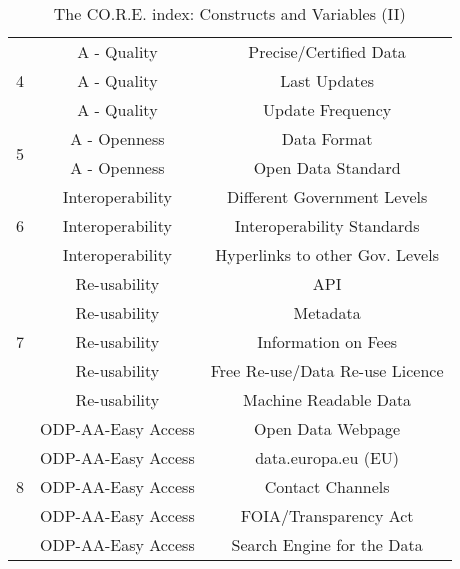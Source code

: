\documentclass[a4paper, twoside]{report}
\begin{document}
\begin{table}[htbp]
  \centering
  \caption{The CO.R.E. index: Constructs and Variables (II)}
   \tabcolsep=0.60cm
	\renewcommand{\arraystretch}{1.2}
	\begin{adjustbox}{max width=\linewidth}
    \begin{tabular}{ccc}
    \toprule
    \multirow{3}[2]{*}{4} & A - Quality & Precise/Certified Data \\
          & \cellcolor[rgb]{ .851,  .851,  .851}A - Quality & \cellcolor[rgb]{ .851,  .851,  .851}Last Updates \\
          & \cellcolor[rgb]{ .851,  .851,  .851}A - Quality & \cellcolor[rgb]{ .851,  .851,  .851}Update Frequency \\
    \midrule
    \multirow{2}[2]{*}{5} & A - Openness & Data Format \\
          & \cellcolor[rgb]{ .851,  .851,  .851}A - Openness & \cellcolor[rgb]{ .851,  .851,  .851}Open Data Standard \\
    \midrule
    \multirow{3}[2]{*}{6} & Interoperability & Different Government Levels \\
          & \cellcolor[rgb]{ .851,  .851,  .851}Interoperability & \cellcolor[rgb]{ .851,  .851,  .851}Interoperability Standards \\
          & \cellcolor[rgb]{ .851,  .851,  .851}Interoperability & \cellcolor[rgb]{ .851,  .851,  .851}Hyperlinks to other Gov. Levels \\
    \midrule
    \multirow{5}[2]{*}{7} & Re-usability & API \\
          & Re-usability & Metadata \\
          & Re-usability & Information on Fees \\
          & \cellcolor[rgb]{ .851,  .851,  .851}Re-usability & \cellcolor[rgb]{ .851,  .851,  .851}Free Re-use/Data Re-use Licence \\
          & \cellcolor[rgb]{ .851,  .851,  .851}Re-usability & \cellcolor[rgb]{ .851,  .851,  .851}Machine Readable Data \\
    \midrule
    \multirow{10}[2]{*}{8} & ODP-AA-Easy Access & Open Data Webpage \\
          & ODP-AA-Easy Access & data.europa.eu (EU) \\
          & ODP-AA-Easy Access & Contact Channels \\
          & ODP-AA-Easy Access & FOIA/Transparency Act \\
          & ODP-AA-Easy Access & Search Engine for the Data \\

\end{tabular}
\end{adjustbox}
\end{table}
\end{document}

